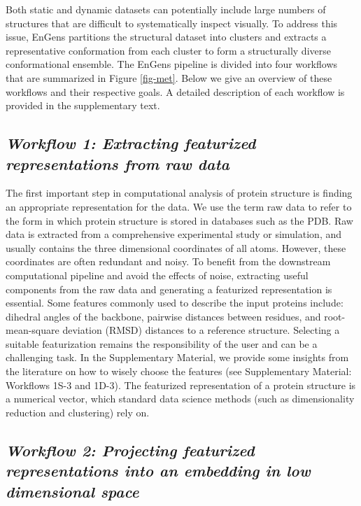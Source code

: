 \documentclass[unnumsec,webpdf,contemporary,large,numsquare]{oup-authoring-template}%
\theoremstyle{thmstyleone}%
\theoremstyle{thmstyletwo}%
\theoremstyle{thmstylethree}%
\begin{document}
Both static and dynamic datasets can potentially include large numbers of structures that are difficult to systematically inspect visually. To address this issue, EnGens partitions the structural dataset into clusters and extracts a representative conformation from each cluster to form a structurally diverse conformational ensemble. The EnGens pipeline is divided into four workflows that are summarized in Figure \ref{fig-met}. Below we give an overview of these workflows and their respective goals. A detailed description of each workflow is provided in the supplementary text. 


\subsection{\textit{\textbf{Workflow 1:} Extracting featurized representations from raw data}}\label{wf1}

The first important step in computational analysis of protein structure is finding an appropriate representation for the data. We use the term raw data to refer to the form in which protein structure is stored in databases such as the PDB. Raw data is extracted from a comprehensive experimental study or simulation, and usually contains the three dimensional coordinates of all atoms.  However, these coordinates are often redundant and noisy. To benefit from the downstream computational pipeline and avoid the effects of noise, extracting useful components from the raw data and generating a featurized representation is essential. Some features commonly used to describe the input proteins include: dihedral angles of the backbone, pairwise distances between residues, and root-mean-square deviation (RMSD) distances to a reference structure. Selecting a suitable featurization remains the responsibility of the user and can be a challenging task. In the Supplementary Material, we provide some insights from the literature on how to wisely choose the features (see Supplementary Material: Workflows 1S-3 and 1D-3). The featurized representation of a protein structure is a numerical vector, which standard data science methods (such as dimensionality reduction and clustering) rely on.  

\subsection{\textit{\textbf{Workflow 2:} Projecting featurized representations into an embedding in low dimensional space}}\label{wf1}
\end{document}
